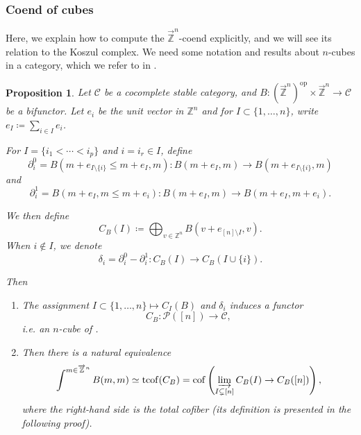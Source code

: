 \documentclass[11pt]{amsart}
\numberwithin{equation}{section}
\theoremstyle{plain}
\newtheorem{Prop}[prop]{Proposition}
\theoremstyle{definition}
\theoremstyle{remark}
\newcommand{\bZ} { {\mathbb{Z}}}
\newcommand{\cC} { {\mathcal{C}}}
\newcommand{\op}{{\operatorname{op}}}
\newcommand\cof{\operatorname{cof}}
\newcommand{\rarbZ} { \overrightarrow{\mathbb{Z}}}
\begin{document}
\subsubsection{Coend of cubes} Here, we explain how to compute the $\rarbZ^n$-coend explicitly, and we will see its relation to the Koszul complex. We need some notation and results about $n$-cubes in a category, which we refer to in \cite{BeckertGroth_Cubical_homotopy}.

\begin{Prop}\label{prop: coend of cube as total cofiber}Let $\cC$ be a cocomplete stable category, and $B:(\rarbZ^n)^\op\times \rarbZ^n\to \cC$ be a bifunctor. Let $e_i$ be the unit vector in $\bZ^n$ and for $I\subset\{1,\ldots,n\} $, write $e_I\coloneqq\sum_{i\in I}e_i$.

For $I=\{i_1<\cdots<i_p\}$ and $i=i_r\in I$, define
\[
\partial_i^0=B(m+e_{I\setminus\{i\}}\le m+e_I,m):
B(m+e_I,m)
\longrightarrow
B(m+e_{I\setminus\{i\}},m)
\]
and 
\[
\partial_i^1=B(m+e_I,m \le m+e_{i}):
B(m+e_I,m)
\longrightarrow
B(m+e_I,m+e_i).
\]

We then define 
\[C_B(I)\coloneqq  
\bigoplus_{v\in\bZ^n}B(v+e_{[n]\setminus I},v).\]
When $i\notin I$, we denote
\[\delta_i=\partial^0_i-\partial^1_i: C_B(I) \to C_{B}(I\cup \{i\}).\]




Then 
\begin{enumerate}
    \item The assignment $I\subset \{1,\ldots,n\} \mapsto C_I(B)$ and $\delta_i$ induces a functor
    \[C_{B}:\mathcal{P}([n]) \to \cC,\]
i.e. an $n$-cube of \cite{BeckertGroth_Cubical_homotopy}.
\item 
Then there is a natural equivalence
\[
\int^{m\in\rarbZ^n}B(m,m)
\simeq
\operatorname{tcof}(C_B)=\cof\left(
\varinjlim_{I\subsetneq[n]} C_B(I)
\to C_B([n]) \right),
\]
where the right-hand side is the total cofiber (its definition is presented in the following proof).
\end{enumerate}
\end{Prop}
\end{document}
